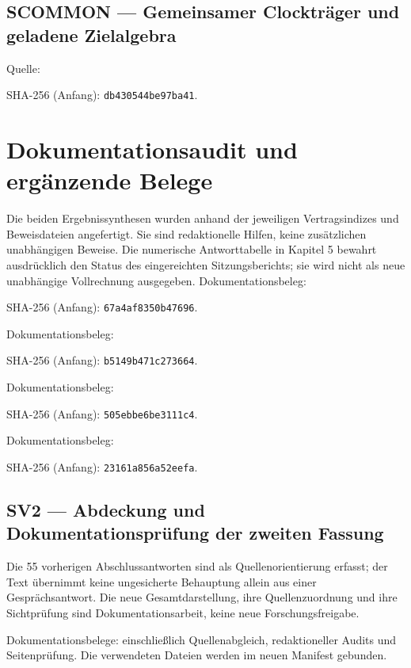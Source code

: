 \subsection*{SCOMMON — Gemeinsamer Clockträger und geladene Zielalgebra}\label{s:COMMON}
Quelle: \par{\footnotesize SHA-256 (Anfang): \texttt{db430544be97ba41}.}\par
\section{Dokumentationsaudit und ergänzende Belege}
Die beiden Ergebnissynthesen wurden anhand der jeweiligen Vertragsindizes und Beweisdateien angefertigt. Sie sind redaktionelle Hilfen, keine zusätzlichen unabhängigen Beweise. Die numerische Antworttabelle in Kapitel 5 bewahrt ausdrücklich den Status des eingereichten Sitzungsberichts; sie wird nicht als neue unabhängige Vollrechnung ausgegeben.
Dokumentationsbeleg: \par{\footnotesize SHA-256 (Anfang): \texttt{67a4af8350b47696}.}\par
Dokumentationsbeleg: \par{\footnotesize SHA-256 (Anfang): \texttt{b5149b471c273664}.}\par
Dokumentationsbeleg: \par{\footnotesize SHA-256 (Anfang): \texttt{505ebbe6be3111c4}.}\par
Dokumentationsbeleg: \par{\footnotesize SHA-256 (Anfang): \texttt{23161a856a52eefa}.}\par

\subsection*{SV2 — Abdeckung und Dokumentationsprüfung der zweiten Fassung}\label{s:V2}
Die 55 vorherigen Abschlussantworten sind als Quellenorientierung erfasst; der Text übernimmt keine ungesicherte Behauptung allein aus einer Gesprächsantwort. Die neue Gesamtdarstellung, ihre Quellenzuordnung und ihre Sichtprüfung sind Dokumentationsarbeit, keine neue Forschungsfreigabe.\par
Dokumentationsbelege:  einschließlich Quellenabgleich, redaktioneller Audits und Seitenprüfung. Die verwendeten Dateien werden im neuen Manifest gebunden.\par

